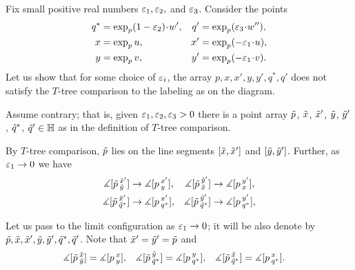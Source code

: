 \begin{wrapfigure}[7]{r}{26 mm}
\end{wrapfigure}

Fix small positive real numbers $\eps_1,\eps_2,$ and $\eps_3$.
Consider the points
\begin{align*}
q^*&=\exp_p(1-\eps_2)\cdot w',
&
q'&=\exp_p(\eps_3\cdot w''),
\\
x&=\exp_p u,
&
x'&=\exp_p (-\eps_1\cdot u),
\\
y&=\exp_p v,
&
y'&=\exp_p (-\eps_1\cdot v).
\end{align*}
Let us show that for some choice of $\eps_i$, the array $p,x,x',y,y',q^*,q'$ does not satisfy the $T$-tree comparison to the labeling as on the diagram.

Assume contrary; that is, given $\eps_1,\eps_2,\eps_3>0$ there is a point array $\~p$, $\~x$, $\~x'$, $\~y$, $\~y'$, $\~q^*$, $\~q'\in\HH$ as in the definition of $T$-tree comparison.

By $T$-tree comparison, $\~p$ lies on the line segments $[\~x,\~x']$ and $[\~y,\~y']$.
Further, as $\eps_1\to 0$ we have 
\begin{align*}
\measuredangle[\~p\,^{\~x'}_{\~y}]&\to \measuredangle[p\,^{x'}_{y}],
&
\measuredangle[\~p\,^{\~y'}_{\~x}]&\to \measuredangle[p\,^{y'}_{x}],
\\
\measuredangle[\~p\,^{\~x'}_{\~q^*}]&\to \measuredangle[p\,^{x'}_{q^*}],
&
\measuredangle[\~p\,^{\~y'}_{\~q^*}]&\to \measuredangle[p\,^{y'}_{q^*}],
\end{align*}

Let us pass to the limit configuration as $\eps_1\to0$;
it will be also denote by $\~p,\~x,\~x',\~y,\~y',\~q^*,\~q'$.
Note that $\~x'=\~y'=\~p$ and 
\begin{align*}
\measuredangle[\~p\,^{\~x}_{\~y}]&= \measuredangle[p\,^{x}_{y}],
&
\measuredangle[\~p\,^{\~y}_{\~q^*}]&= \measuredangle[p\,^{y}_{q^*}],
&
\measuredangle[\~p\,^{\~x}_{\~q^*}]&= \measuredangle[p\,^{x}_{q^*}].
\end{align*}

